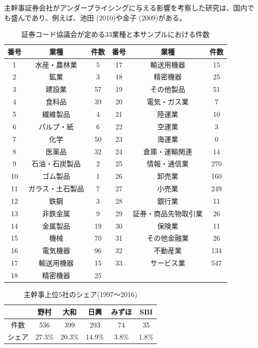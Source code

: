 \documentclass{jsarticle}
\begin{document}
主幹事証券会社がアンダープライシングに与える影響を考察した研究は、国内でも盛んであり、例えば、池田 (2010)\cite{ikeda2}や金子 (2009)\cite{kaneko}がある。
\newpage
\begin{table}[!h]
\centering

  \caption{証券コード協議会が定める33業種と本サンプルにおける件数}
\begin{tabular}{|c|c|c||c|c|c|}

\hline
番号 & 業種 & 件数 & 番号 & 業種 & 件数 \\
\hline \hline
1 & 水産・農林業 & 5 & 17 & 輸送用機器 & 15 \\
2 & 鉱業 & 3 & 18 & 精密機器 & 25 \\
3 & 建設業 & 57 & 19 & その他製品 & 51 \\
4 & 食料品 & 39 & 20 & 電気・ガス業 & 7 \\
5 & 繊維製品 & 4 & 21 & 陸運業 & 10 \\
6 & パルプ・紙 & 6 & 22 & 空運業 & 3 \\
7 & 化学 & 50 & 23 & 海運業 & 0 \\
8 & 医薬品 & 32 & 24 & 倉庫・運輸関連 & 14 \\
9 & 石油・石炭製品 & 2 & 25 & 情報・通信業 & 270 \\
10 & ゴム製品 & 1 & 26 & 卸売業 & 160 \\
11 & ガラス・土石製品 & 7 & 27 & 小売業 & 249 \\
12 & 鉄鋼 & 3 & 28 & 銀行業 & 11 \\
13 & 非鉄金属 & 9 & 29 & 証券・商品先物取引業  & 26 \\
14 & 金属製品 & 19 & 30 & 保険業 & 11 \\
15 & 機械 & 70 & 31 & その他金融業 & 26 \\
16 & 電気機器 & 96 & 32 & 不動産業 & 134 \\
17 & 輸送用機器 & 15 & 33 & サービス業 & 547 \\
18 & 精密機器 & 25 &  &  &  \\

\hline
	\end{tabular}
		\label{industry}
\end{table}

\begin{table}[h]
  \begin{center}
  \caption{主幹事上位5社のシェア(1997〜2016)}
\begin{tabular*}{120mm}{@{\extracolsep{\fill}}c|ccccc}

\hline
\ &  野村 &  大和 & 日興 & みずほ & SBI \\
\hline \hline
件数  &   536 & 399 & 293 & 74 & 35 \\
シェア & 27.3\% & 20.3\% & 14.9\% & 3.8\% & 1.8\% \\
\hline
	\end{tabular*}
	\label{lead} 
  \end{center}
\end{table}
\end{document}
